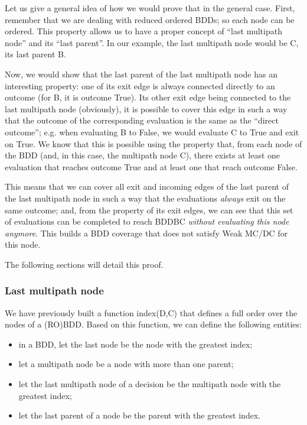 \documentclass[a4paper,12pt,twoside]{article}
\begin{document}
Let us give a general idea of how we would prove that in the general
case. First, remember that we are dealing with reduced ordered BDDs;
so each node can be ordered. This property allows us to have a proper
concept of ``last multipath node'' and its ``last parent''. In our
example, the last multipath node would be C, its last parent B.

Now, we would show that the last parent of the last multipath node has
an interesting property: one of its exit edge is always connected
directly to an outcome (for B, it is outcome True). Its other exit
edge being connected to the last multipath node (obviously), it is
possible to cover this edge in such a way that the outcome of the
corresponding evaluation is the same as the ``direct outcome'';
e.g. when evaluating B to False, we would evaluate C to True and exit
on True. We know that this is possible using the property that, from
each node of the BDD (and, in this case, the multipath node C), there
exists at least one evaluation that reaches outcome True and at least
one that reach outcome False.

This means that we can cover all exit and incoming edges of the last
parent of the last multipath node in such a way that the evaluations
\textit{always} exit on the same outcome; and, from the property of
its exit edges, we can see that this set of evaluations can be
completed to reach BDDBC
\textit{without evaluating this node anymore}. This builds a BDD coverage
that does not satisfy Weak MC/DC for this node.

The following sections will detail this proof.

\subsubsection{Last multipath node}

We have previously built a function index(D,C) that defines a full
order over the nodes of a (RO)BDD. Based on this function, we can
define the following entities:
\begin{itemize}
\item in a BDD, let the last node be the node with the greatest index;
\item let a multipath node be a node with more than one parent;
\item let the last multipath node of a decision be the multipath node with the
      greatest index;
\item let the last parent of a node be the parent with the greatest index.
\end{itemize}
\end{document}
